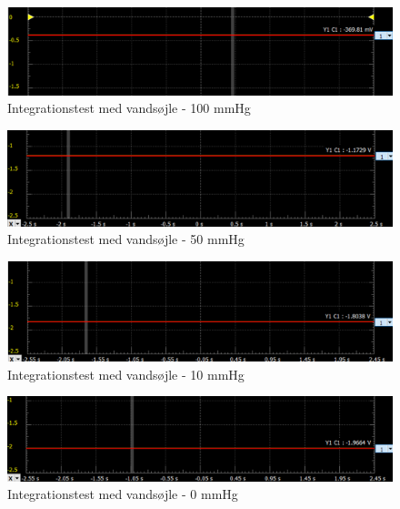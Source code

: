 \begin{figure}[h!]
	\centering
	\includegraphics[width=0.75\linewidth]{../Rapport/Implementering_og_test/Hardware/integration100mmhg}
	\caption{Integrationstest med vandsøjle - 100 mmHg}
	\label{fig:i100mmhg}
\end{figure}

\begin{figure}[h!]
	\centering
	\includegraphics[width=0.75\linewidth]{../Rapport/Implementering_og_test/Hardware/integration50mmhg}
	\caption{Integrationstest med vandsøjle - 50 mmHg}
	\label{fig:i50mmhg}
\end{figure}

\begin{figure}[h!]
	\centering
	\includegraphics[width=0.75\linewidth]{../Rapport/Implementering_og_test/Hardware/integration10mmhg}
	\caption{Integrationstest med vandsøjle - 10 mmHg}
	\label{fig:i10mmgh}
\end{figure}

\begin{figure}[h!]
	\centering
	\includegraphics[width=0.75\linewidth]{../Rapport/Implementering_og_test/Hardware/integration0mmhg}
	\caption{Integrationstest med vandsøjle - 0 mmHg}
	\label{fig:i0mmhg}
\end{figure}

